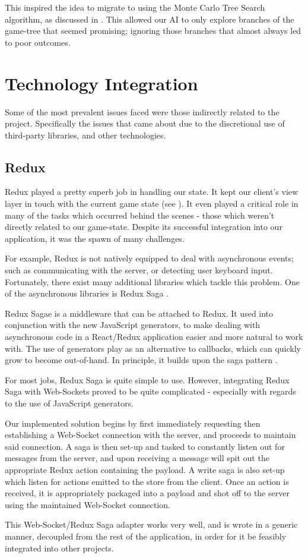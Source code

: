 \documentclass{standalone}
\begin{document}
		This inspired the idea to migrate to using the Monte Carlo Tree Search algorithm, as discussed in . This allowed our AI to only explore branches of the game-tree that seemed promising; ignoring those branches that almost always led to poor outcomes.

	\section{Technology Integration}
		Some of the most prevalent issues faced were those indirectly related to the project. Specifically the issues that came about due to the discretional use of third-party libraries, and other technologies.

		\subsection{Redux}
			Redux played a pretty superb job in handling our state. It kept our client's view layer in touch with the current game state (see ). It even played a critical role in many of the tasks which occurred behind the scenes - those which weren't directly related to our game-state. Despite its successful integration into our application, it was the spawn of many challenges.

			For example, Redux is not natively equipped to deal with asynchronous events; such as communicating with the server, or detecting user keyboard input. Fortunately, there exist many additional libraries which tackle this problem. One of the asynchronous libraries is Redux Saga \parencite{reduxSaga}.

			Redux Sagae is a middleware that can be attached to Redux. It used into conjunction with the new JavaScript generators, to make dealing with asynchronous code in a React/Redux application easier and more natural to work with. The use of generators play as an alternative to callbacks, which can quickly grow to become out-of-hand. In principle, it builds upon the saga pattern \parencite{sagas}.

			For most jobs, Redux Saga is quite simple to use. However, integrating Redux Saga with Web-Sockets proved to be quite complicated - especially with regards to the use of JavaScript generators.

			Our implemented solution begins by first immediately requesting then establishing a Web-Socket connection with the server, and proceeds to maintain said connection. A saga is then set-up and tasked to constantly listen out for messages from the server, and upon receiving a message will spit out the appropriate Redux action containing the payload. A write saga is also set-up which listen for actions emitted to the store from the client. Once an action is received, it is appropriately packaged into a payload and shot off to the server using the maintained Web-Socket connection.

			This Web-Socket/Redux Saga adapter works very well, and is wrote in a generic manner, decoupled from the rest of the application, in order for it be feasibly integrated into other projects.
\end{document}
